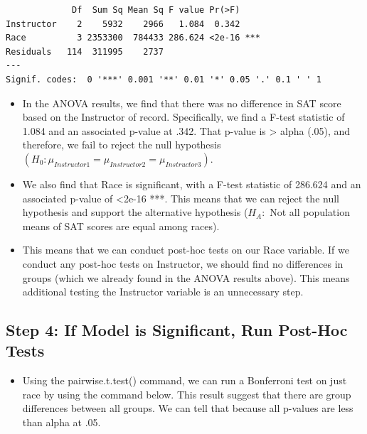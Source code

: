 \documentclass[
  letterpaper,
  DIV=11,
  numbers=noendperiod]{scrreprt}
\newenvironment{Shaded}{\begin{snugshade}}{\end{snugshade}}
\newcommand{\AttributeTok}[1]{\textcolor[rgb]{0.40,0.45,0.13}{#1}}
\newcommand{\FunctionTok}[1]{\textcolor[rgb]{0.28,0.35,0.67}{#1}}
\newcommand{\NormalTok}[1]{\textcolor[rgb]{0.00,0.23,0.31}{#1}}
\newcommand{\SpecialCharTok}[1]{\textcolor[rgb]{0.37,0.37,0.37}{#1}}
\newcommand{\StringTok}[1]{\textcolor[rgb]{0.13,0.47,0.30}{#1}}
\providecommand{\tightlist}{%
  \setlength{\itemsep}{0pt}\setlength{\parskip}{0pt}}\usepackage{longtable,booktabs,array}
\begin{document}
\begin{verbatim}
             Df  Sum Sq Mean Sq F value Pr(>F)    
Instructor    2    5932    2966   1.084  0.342    
Race          3 2353300  784433 286.624 <2e-16 ***
Residuals   114  311995    2737                   
---
Signif. codes:  0 '***' 0.001 '**' 0.01 '*' 0.05 '.' 0.1 ' ' 1
\end{verbatim}

\begin{itemize}
\item
  In the ANOVA results, we find that there was no difference in SAT
  score based on the Instructor of record. Specifically, we find a
  F-test statistic of 1.084 and an associated p-value at .342. That
  p-value is \textgreater{} alpha (.05), and therefore, we fail to
  reject the null hypothesis
  \((H_0:  \mu_{Instructor1} = \mu_{Instructor2}= \mu_{Instructor3})\).
\item
  We also find that Race is significant, with a F-test statistic of
  286.624 and an associated p-value of \textless2e-16 ***. This means
  that we can reject the null hypothesis and support the alternative
  hypothesis (\(H_A:\) Not all population means of SAT scores are equal
  among races).
\item
  This means that we can conduct post-hoc tests on our Race variable. If
  we conduct any post-hoc tests on Instructor, we should find no
  differences in groups (which we already found in the ANOVA results
  above). This means additional testing the Instructor variable is an
  unnecessary step.
\end{itemize}

\subsection{Step 4: If Model is Significant, Run Post-Hoc
Tests}\label{step-4-if-model-is-significant-run-post-hoc-tests-1}

\begin{itemize}
\tightlist
\item
  Using the pairwise.t.test() command, we can run a Bonferroni test on
  just race by using the command below. This result suggest that there
  are group differences between all groups. We can tell that because all
  p-values are less than alpha at .05.\\
\end{itemize}

\begin{Shaded}
\end{Shaded}
\end{document}

